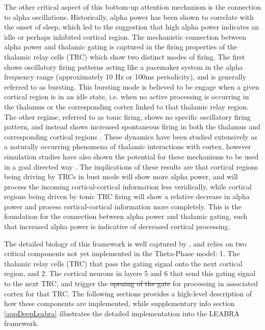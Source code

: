 \documentclass[11pt, titlepage, twoside]{article}
\providecommand{\DIFadd}[1]{{\protect\color{blue}\uwave{#1}}} %
\providecommand{\DIFdel}[1]{{\protect\color{red}\sout{#1}}}                      %
\providecommand{\DIFaddbegin}{} %
\providecommand{\DIFaddend}{} %
\providecommand{\DIFdelbegin}{} %
\providecommand{\DIFdelend}{} %
\begin{document}
The other critical aspect of this bottom-up attention mechanism is the connection to alpha oscillations.  Historically, alpha power has been shown to correlate with the onset of sleep, which led to the suggestion that high alpha power indicates an idle or perhaps inhibited cortical region.  The mechanistic connection between alpha power and thalamic gating is captured in the firing properties of the thalamic relay cells (TRC) which show two distinct modes of firing.  The first shows oscillatory firing patterns acting like a pacemaker system in the alpha frequency range (approximately 10 Hz or 100ms periodicity), and is generally referred to as bursting.  This bursting mode is believed to be engage when a given cortical region is in an idle state, i.e. when no active processing is occurring in the thalamus or the corresponding cortex linked to that thalamic relay region.  The other regime, referred to as tonic firing, shows no specific oscillatory firing pattern, and instead shows increased spontaneous firing in both the thalamus and corresponding cortical regions \parencite{LerescheLightowlerSolteszEtAl91,ShermanGuillery06,LopesdaSilva91}.  These dynamics have been studied extensively as a naturally occurring phenomena of thalamic interactions with cortex, however simulation studies have also shown the potential for these mechanisms to be used in a goal directed way \parencite{HindriksvanPutten13,VijayanKopell12,LeeWhittingtonKopell13}. The implications of these results are that cortical regions being driving by TRCs in bust mode will show more alpha power, and will process the incoming cortical-cortical information less veridically, while cortical regions being driven by tonic TRC firing will show a relative decrease in alpha power and process cortical-cortical information more completely.  This is the foundation for the connection between alpha power and thalamic gating, such that increased alpha power is indicative of decreased cortical processing.

The detailed biology of this framework is well captured by \textcite{ShermanGuillery06}, and relies on two critical components not yet implemented in the Theta-Phase model: 1. The thalamic relay cells (TRC) that pass the gating signal onto the next cortical region, and 2. The cortical neurons in layers 5 and 6 that send this gating signal to the next TRC, and trigger the \DIFdelbegin \DIFdel{opening of the gate }\DIFdelend \DIFaddbegin \DIFadd{release from inhibition }\DIFaddend for processing in associated cortex for that TRC.  The following sections provides a high-level description of how these components are implemented, while supplementary info section \ref{appDeepLeabra} illustrates the detailed implementation into the LEABRA framework.
\end{document}
